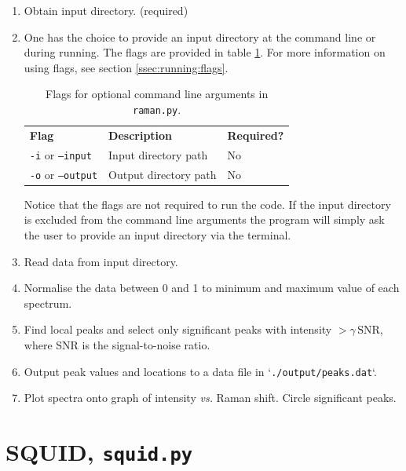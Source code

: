 \begin{enumerate}
	\item	Obtain input directory. (required)
	\item[]	%
		{One has the choice to provide an input directory at the command line or during running. The flags are provided in table \ref{tab:raman:flags}. For more information on using flags, see section \ref{ssec:running:flags}.
		
		\begin{table}[H]
			\begin{center}
				\begin{tabular}{l l l}
					\hline
					\textbf{Flag}	&	\textbf{Description}	&	\textbf{Required?}\\
					\texttt{-i} or \texttt{--input}		& Input directory path	&	No	\\
					\texttt{-o} or \texttt{--output}	& Output directory path	&	No	\\
					\hline
				\end{tabular}
			\end{center}
			\caption[Raman flags.]{\label{tab:raman:flags}%
				Flags for optional command line arguments in \texttt{raman.py}.%
			}
		\end{table}
		
		Notice that the flags are not required to run the code. If the input directory is excluded from the command line arguments the program will simply ask the user to provide an input directory via the terminal.
		}
	\item	Read data from input directory.
	\item	Normalise the data between 0 and 1 to minimum and maximum value of each spectrum.
	\item	Find local peaks and select only significant peaks with intensity $ > \gamma\,\text{SNR} $, where SNR is the signal-to-noise ratio.
	\item	Output peak values and locations to a data file in `\texttt{./output/peaks.dat}`.
	\item	Plot spectra onto graph of intensity \textit{vs.} Raman shift. Circle significant peaks.
\end{enumerate}


\pagebreak
\section{SQUID, \texttt{squid.py}}

